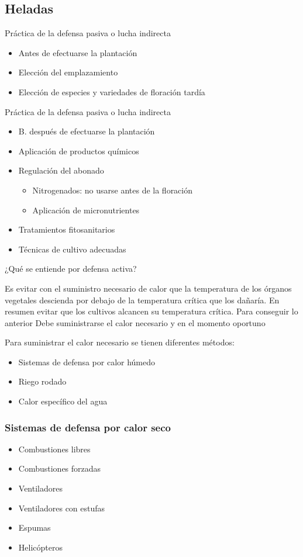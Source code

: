 \subsection{Heladas}
Práctica de la defensa pasiva o lucha indirecta
\begin{itemize}
    \item Antes de efectuarse la plantación
    \item Elección del emplazamiento
    \item Elección de especies y variedades de floración tardía    
\end{itemize}
Práctica de la defensa pasiva o lucha indirecta
\begin{itemize}
    \item B. después de efectuarse la plantación
    \item Aplicación de productos químicos
    \item Regulación del abonado \begin{itemize}
        \item Nitrogenados: no usarse antes de la floración
        \item Aplicación de micronutrientes
    \end{itemize}
    \item Tratamientos fitosanitarios
    \item Técnicas de cultivo adecuadas
\end{itemize}
¿Qué se entiende por defensa activa?

Es evitar con el suministro necesario de calor que la temperatura de los órganos vegetales descienda por debajo de la temperatura crítica que los dañaría. En resumen evitar que los cultivos alcancen su temperatura crítica. Para conseguir lo anterior Debe suministrarse el calor necesario y en el momento oportuno

Para suministrar el calor necesario se tienen diferentes métodos:
\begin{itemize}
    \item Sistemas de defensa por calor húmedo
    \item Riego rodado
    \item Calor específico del agua
\end{itemize}
\subsubsection{Sistemas de defensa por calor seco}
\begin{itemize}
    \item Combustiones libres
    \item Combustiones forzadas
    \item Ventiladores
    \item Ventiladores con estufas
    \item Espumas
    \item Helicópteros
\end{itemize}

